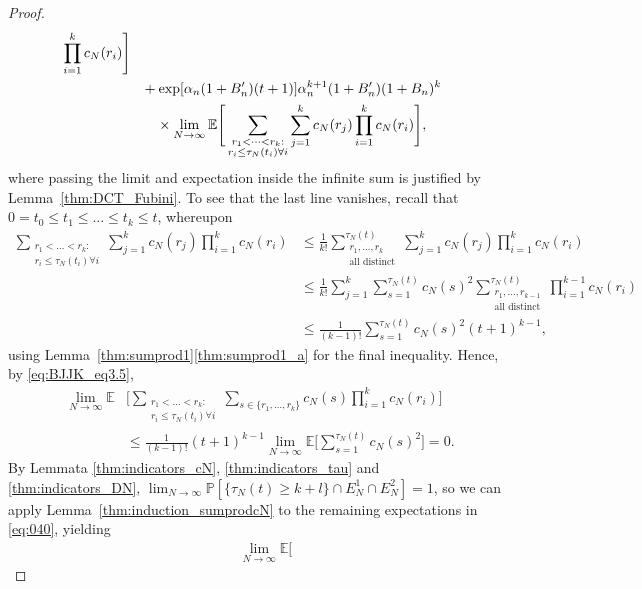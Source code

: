 \documentclass[12pt,authoryear]{article}
\theoremstyle{definition}
\newcommand{\Prob}{\mathbb{P}}
\newcommand{\E}{\mathbb{E}}
\newcommand{\1}[1]{\mathbbm{1}_{#1}}
\begin{document}
\begin{proof}
\begin{align}
        \prod_{i=1}^k c_N(r_i) \Bigg] \notag\\
    &\phantom{\leq}+ \exp[ \alpha_n (1 + B_n^\prime) (t+1) ]
        \alpha_n^{k+1} (1 + B_n^\prime) (1 + B_n)^k \notag\\
    &\phantom{\leq +} \times \lim_{N\to\infty} \E \Bigg[ 
        \sum_{\substack{r_1 <\dots< r_k :\\ r_i \leq \tau_N(t_i) \forall i}}
        \sum_{j=1}^k c_N(r_j)
        \prod_{i=1}^k c_N(r_i) \Bigg] , \label{eq:040}
\end{align}
where passing the limit and expectation inside the infinite sum is justified by Lemma~\ref{thm:DCT_Fubini}.
To see that the last line vanishes, recall that $0 = t_0 \leq t_1 \leq \ldots \leq t_k \leq t$, whereupon
\begin{align*}
\sum_{\substack{r_1 <\dots< r_k :\\ r_i \leq \tau_N(t_i) \forall i}}
        \sum_{j=1}^k c_N(r_j)
        \prod_{i=1}^k c_N(r_i)
&\leq \frac{1}{k!} \sum_{\substack{r_1, \dots, r_k \\ \text{all distinct} }}^{\tau_N(t)}
        \sum_{j=1}^k c_N(r_j)
        \prod_{i=1}^k c_N(r_i) \\
&\leq \frac{1}{k!} 
        \sum_{j=1}^k \sum_{s=1}^{\tau_N(t)} c_N(s)^2
        \sum_{\substack{r_1, \dots, r_{k-1} \\ \text{all distinct} }}^{\tau_N(t)}
        \prod_{i=1}^{k-1} c_N(r_i) \\
&\leq \frac{1}{(k-1)!} 
        \sum_{s=1}^{\tau_N(t)} c_N(s)^2
        (t+1)^{k-1},
\end{align*}
using Lemma~\ref{thm:sumprod1}\ref{thm:sumprod1_a} for the final inequality.
Hence, by \eqref{eq:BJJK_eq3.5},
\begin{align*}
\lim_{N\to\infty} \E &\Bigg[ \sum_{\substack{r_1 <\dots< r_k :\\ r_i \leq \tau_N(t_i) \forall i}}
        \sum_{s \in \{r_1,\dots,r_k\} } c_N(s) \prod_{i=1}^k c_N(r_i) \Bigg] \\
&\leq \frac{1}{(k-1)!} (t+1)^{k-1}
         \lim_{N\to\infty} \E \Bigg[ \sum_{s=1}^{\tau_N(t)} c_N(s)^2 \Bigg] = 0.
\end{align*}
By Lemmata \ref{thm:indicators_cN}, \ref{thm:indicators_tau} and \ref{thm:indicators_DN}, $\lim_{N\to\infty} \Prob[ \{ \tau_N(t)\geq k+l \} \cap E_N^1 \cap E_N^2 ] =1$,  so we can apply Lemma~\ref{thm:induction_sumprodcN} to the remaining expectations in \eqref{eq:040}, yielding
\begin{align*}
&\lim_{N\to\infty} \E \Bigg[ 

\end{align*}
\end{proof}
\end{document}
